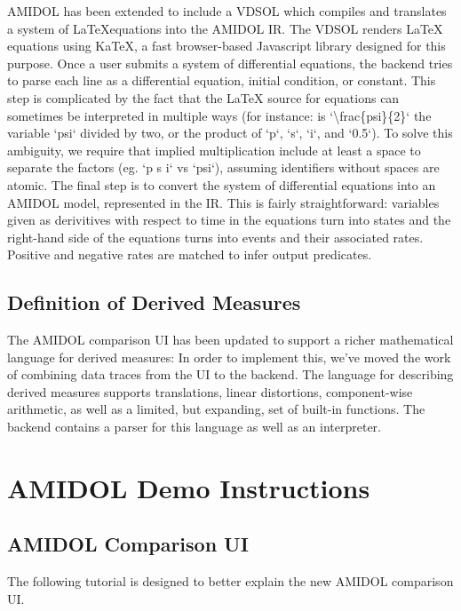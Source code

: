 \documentclass[12pt]{galois-whitepaper}
\begin{document}
AMIDOL has been extended to include a VDSOL which compiles and
translates a system of \LaTeX equations into the AMIDOL IR. The VDSOL renders LaTeX
equations using KaTeX, a fast browser-based Javascript library
designed for this purpose. Once a user submits a system of
differential equations, the backend tries to parse each line as a
differential equation, initial condition, or constant. This step is
complicated by the fact that the LaTeX source for equations can
sometimes be interpreted in multiple ways (for instance: is
`\textbackslash frac\{psi\}\{2\}` the variable `psi` divided by two, or
the product of `p`, `s`, `i`, and `0.5`). To solve this ambiguity, we
require that implied multiplication include at least a space to
separate the factors (eg. `p s i` vs `psi`), assuming identifiers
without spaces are atomic. The final step is to
convert the system of differential equations into an AMIDOL
model, represented in the IR. This is fairly straightforward:
variables given as derivitives with respect to time in the equations turn
into states and the right-hand side of the equations turns into
events and their associated rates.  Positive and negative rates are
matched to infer output predicates.

\subsection{Definition of Derived Measures}

The AMIDOL comparison UI has been updated
to support a richer mathematical language
for derived measures:  In order to implement this, we’ve moved the
work of combining data traces from the UI to the backend. The language
for describing derived measures supports translations, linear
distortions, component-wise arithmetic, as well as a limited, but
expanding, set of built-in functions. The backend contains a parser for this language as
well as an interpreter.

\section{AMIDOL Demo Instructions}

\subsection{AMIDOL Comparison UI}

The following tutorial is designed to better explain the new AMIDOL
comparison UI.
\end{document}
